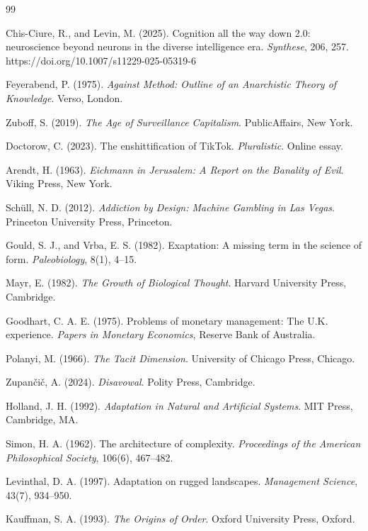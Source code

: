 \documentclass[11pt]{article}
\theoremstyle{definition}
\begin{document}
\newpage
\begin{thebibliography}{99}

Chis-Ciure, R., and Levin, M. (2025).
\newblock Cognition all the way down 2.0: neuroscience beyond neurons in the diverse intelligence era.
\newblock \emph{Synthese}, 206, 257.
\newblock https://doi.org/10.1007/s11229-025-05319-6

Feyerabend, P. (1975).
\newblock \emph{Against Method: Outline of an Anarchistic Theory of Knowledge}.
\newblock Verso, London.

Zuboff, S. (2019).
\newblock \emph{The Age of Surveillance Capitalism}.
\newblock PublicAffairs, New York.

Doctorow, C. (2023).
\newblock The enshittification of TikTok.
\newblock \emph{Pluralistic}.
\newblock Online essay.

Arendt, H. (1963).
\newblock \emph{Eichmann in Jerusalem: A Report on the Banality of Evil}.
\newblock Viking Press, New York.

Sch{\"u}ll, N. D. (2012).
\newblock \emph{Addiction by Design: Machine Gambling in Las Vegas}.
\newblock Princeton University Press, Princeton.

Gould, S. J., and Vrba, E. S. (1982).
\newblock Exaptation: A missing term in the science of form.
\newblock \emph{Paleobiology}, 8(1), 4--15.

Mayr, E. (1982).
\newblock \emph{The Growth of Biological Thought}.
\newblock Harvard University Press, Cambridge.

Goodhart, C. A. E. (1975).
\newblock Problems of monetary management: The U.K. experience.
\newblock \emph{Papers in Monetary Economics}, Reserve Bank of Australia.

Polanyi, M. (1966).
\newblock \emph{The Tacit Dimension}.
\newblock University of Chicago Press, Chicago.

Zupan{\v c}i{\v c}, A. (2024).
\newblock \emph{Disavowal}.
\newblock Polity Press, Cambridge.

Holland, J. H. (1992).
\newblock \emph{Adaptation in Natural and Artificial Systems}.
\newblock MIT Press, Cambridge, MA.

Simon, H. A. (1962).
\newblock The architecture of complexity.
\newblock \emph{Proceedings of the American Philosophical Society}, 106(6), 467--482.

Levinthal, D. A. (1997).
\newblock Adaptation on rugged landscapes.
\newblock \emph{Management Science}, 43(7), 934--950.

Kauffman, S. A. (1993).
\newblock \emph{The Origins of Order}.
\newblock Oxford University Press, Oxford.

\end{thebibliography}
\end{document}
